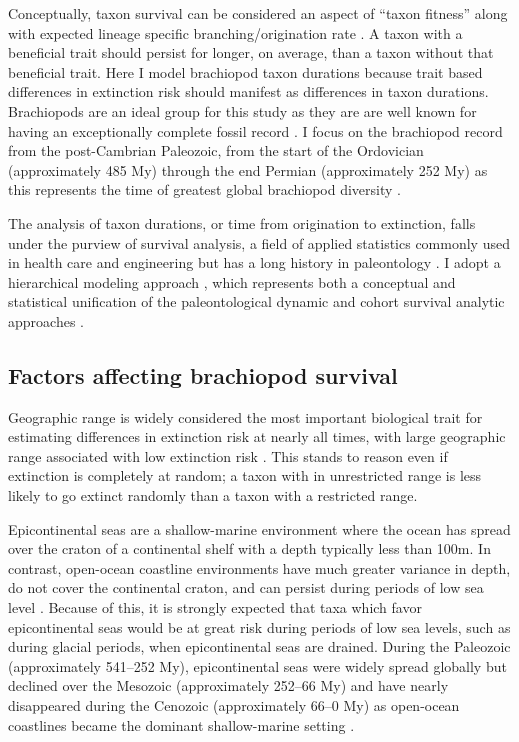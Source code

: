 \documentclass{article}
\begin{document}
Conceptually, taxon survival can be considered an aspect of ``taxon fitness'' along with expected lineage specific branching/origination rate \citep{Cooper1984,Palmer2012}. A taxon with a beneficial trait should persist for longer, on average, than a taxon without that beneficial trait. Here I model brachiopod taxon durations because trait based differences in extinction risk should manifest as differences in taxon durations. Brachiopods are an ideal group for this study as they are are well known for having an exceptionally complete fossil record \citep{Foote1996e,Foote2000a}. I focus on the brachiopod record from the post-Cambrian Paleozoic, from the start of the Ordovician (approximately 485 My) through the end Permian (approximately 252 My) as this represents the time of greatest global brachiopod diversity \citep{Alroy2010}.

The analysis of taxon durations, or time from origination to extinction, falls under the purview of survival analysis, a field of applied statistics commonly used in health care and engineering \citep{Klein2003} but has a long history in paleontology \citep{Simpson1944,Simpson1953,VanValen1973,VanValen1979,Smits2015,Crampton2016}. I adopt a hierarchical modeling approach \citep{Gelman2007,Gelman2013d,Klein2003}, which represents both a conceptual and statistical unification of the paleontological dynamic and cohort survival analytic approaches \citep{VanValen1973,VanValen1979,Raup1978,Raup1975,Foote1988,Baumiller1993,Simpson2006,Smits2015,Crampton2016,Ezard2012b}. 

\subsection{Factors affecting brachiopod survival}

Geographic range is widely considered the most important biological trait for estimating differences in extinction risk at nearly all times, with large geographic range associated with low extinction risk \citep{Jablonski1986,Jablonski1987,Jablonski2003,Payne2007,Jablonski2008a,Harnik2013,Finnegan2012a}. This stands to reason even if extinction is completely at random; a taxon with in unrestricted range is less likely to go extinct randomly than a taxon with a restricted range.

Epicontinental seas are a shallow-marine environment where the ocean has spread over the craton of a continental shelf with a depth typically less than 100m. In contrast, open-ocean coastline environments have much greater variance in depth, do not cover the continental craton, and can persist during periods of low sea level \citep{Miller2009a}. Because of this, it is strongly expected that taxa which favor epicontinental seas would be at great risk during periods of low sea levels, such as during glacial periods, when epicontinental seas are drained. During the Paleozoic (approximately 541--252 My), epicontinental seas were widely spread globally but declined over the Mesozoic (approximately 252--66 My) and have nearly disappeared during the Cenozoic (approximately 66--0 My) as open-ocean coastlines became the dominant shallow-marine setting \citep{Peters2008,Miller2009a,Johnson1974}. 
\end{document}
